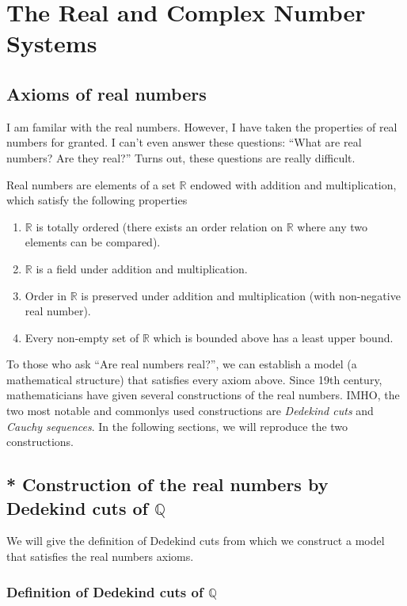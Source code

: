 \chapter{The Real and Complex Number Systems}

\section{Axioms of real numbers}

I am familar with the real numbers. However, I have taken the properties of real numbers for granted. I can't even answer these questions: ``What are real numbers? Are they real?\@'' Turns out, these questions are really difficult.

Real numbers are elements of a set $\mathbb{R}$ endowed with addition and multiplication, which satisfy the following properties
\begin{enumerate}[label = (\roman*)]
    \item $\mathbb{R}$ is totally ordered (there exists an order relation on $\mathbb{R}$ where any two elements can be compared).
    \item $\mathbb{R}$ is a field under addition and multiplication.
    \item Order in $\mathbb{R}$ is preserved under addition and multiplication (with non-negative real number).
    \item Every non-empty set of $\mathbb{R}$ which is bounded above has a least upper bound.
\end{enumerate}

To those who ask ``Are real numbers real?\@'', we can establish a model (a mathematical structure) that satisfies every axiom above. Since 19th century, mathematicians have given several constructions of the real numbers. IMHO, the two most notable and commonlys used constructions are \textit{Dedekind cuts} and \textit{Cauchy sequences}. In the following sections, we will reproduce the two constructions.

\section{* Construction of the real numbers by Dedekind cuts of $\mathbb{Q}$}

We will give the definition of Dedekind cuts from which we construct a model that satisfies the real numbers axioms.

\subsection{Definition of Dedekind cuts of $\mathbb{Q}$}

